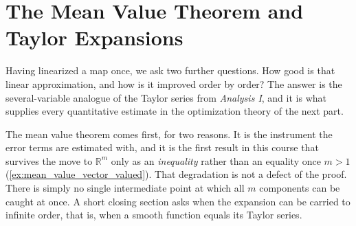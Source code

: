 \chapter{The Mean Value Theorem and Taylor Expansions}
\label{ch:taylor}

Having linearized a map once, we ask two further questions. How good is that linear approximation,
and how is it improved order by order? The answer is the several-variable analogue of the Taylor
series from \emph{Analysis I}, and it is what supplies every quantitative estimate in the
optimization theory of the next part.

The mean value theorem comes first, for two reasons. It is the instrument the error terms are
estimated with, and it is the first result in this course that survives the move to
$\mathbb{R}^m$ only as an \emph{inequality} rather than an equality once $m > 1$ (\cref{ex:mean_value_vector_valued}).
That degradation is not a defect of the proof. There is simply no single intermediate point at
which all $m$ components can be caught at once. A short closing section asks when the expansion
can be carried to infinite order, that is, when a smooth function equals its Taylor series.





